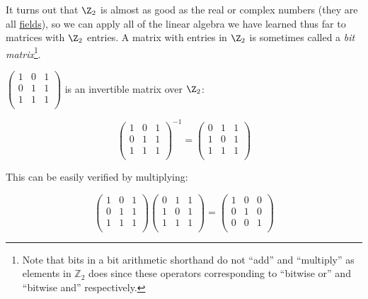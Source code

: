 It turns out that $\Z_2$ is almost as good as the real or complex numbers (they are all \hyperref[fields]{fields}), so we can apply all of the linear algebra we have learned thus far to matrices with $\Z_2$ entries.  A matrix with entries in $\Z_2$ is sometimes called a \emph{bit matrix}\footnote{Note that bits in a bit arithmetic shorthand do not ``add'' and ``multiply'' as elements in $\mathbb{Z}_2$ does since these operators corresponding to ``bitwise or'' and ``bitwise and'' respectively.}.

\begin{example}
$\begin{pmatrix}
1 & 0 & 1 \\
0 & 1 & 1 \\
1 & 1 & 1 \\
\end{pmatrix}$ is an invertible matrix over $\Z_2$:

\[\begin{pmatrix}
1 & 0 & 1 \\
0 & 1 & 1 \\
1 & 1 & 1 \\
\end{pmatrix}^{-1}=\begin{pmatrix}
0 & 1 & 1 \\
1 & 0 & 1 \\
1 & 1 & 1 \\
\end{pmatrix}
\]

This can be easily verified by multiplying:

\[\begin{pmatrix}
1 & 0 & 1 \\
0 & 1 & 1 \\
1 & 1 & 1 \\
\end{pmatrix}\begin{pmatrix}
0 & 1 & 1 \\
1 & 0 & 1 \\
1 & 1 & 1 \\
\end{pmatrix}=\begin{pmatrix}
1 & 0 & 0 \\
0 & 1 & 0 \\
0 & 0 & 1 \\
\end{pmatrix}
\]
\end{example}

